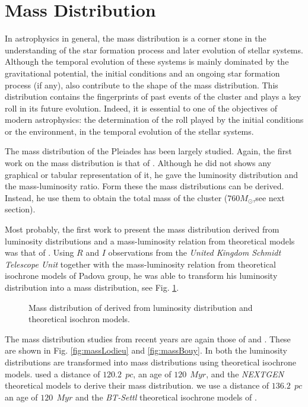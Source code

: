 \section{Mass Distribution}

In astrophysics in general, the mass distribution is a corner stone in the understanding of the star formation process and later evolution of stellar systems. Although the temporal evolution of these systems is mainly dominated by the gravitational potential, the initial conditions and an ongoing star formation process (if any), also contribute to the shape of the mass distribution. This distribution contains the fingerprints of past events of the cluster and plays a key roll in its future evolution. Indeed, it is essential to one of the objectives of modern astrophysics: the determination of the roll played by the initial conditions or the environment, in the temporal evolution of the stellar systems. 

The mass distribution of the Pleiades has been largely studied. Again, the first work on the mass distribution is that of \citet{Limber1962}. Although he did not shows any graphical or tabular representation of it, he gave the luminosity distribution and the mass-luminosity ratio. Form these the mass distributions can be derived. Instead, he use them to obtain the total mass of the cluster ($760 M_{\odot}$,see next section). 

Most probably, the first work to present the mass distribution derived from luminosity distributions and a mass-luminosity relation from theoretical models was that of \citet{Hambly1991}. Using $R$ and $I$ observations from the \emph{United Kingdom Schmidt Telescope Unit} together with the mass-luminosity relation from theoretical isochrone models of Padova group, he was able to transform his luminosity distribution into a mass distribution, see Fig. \ref{fig:massHambly}. 

\begin{figure}[htbp]
\begin{center}
\caption{Mass distribution of \citet{Hambly1991} derived from luminosity distribution and theoretical isochron models.}
\label{fig:massHambly}
\end{center}
\end{figure}

The mass distribution studies from recent years are again those of \citet{Lodieu2012} and \citet{Bouy2015}. These are shown in Fig. \ref{fig:massLodieu} and \ref{fig:massBouy}. In both the luminosity distributions are transformed into mass distributions using theoretical isochrone models. \citet{Lodieu2012} used a distance of $120.2 \ \ pc$, an age of $120\ \ Myr$, and the \emph{NEXTGEN} theoretical models \citet{1998A&A...337..403B} to derive their mass distribution. \citet{Bouy2015} we use a distance of $136.2\ \ pc$ an age of $120\ \ Myr$ and the \emph{BT-Settl} theoretical isochrone models of \citet{2014IAUS..299..271A}. 


